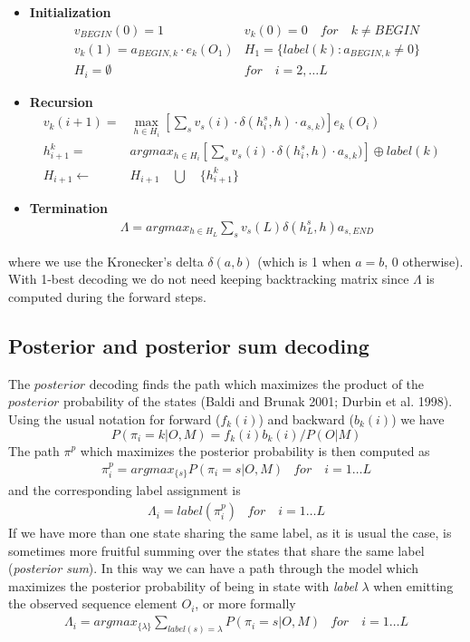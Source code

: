 \documentclass[11pt,english]{article}
\begin{document}
\begin{itemize}
\item {\bf Initialization}
\begin{eqnarray*}
v_{BEGIN}(0)=1 & v_{k}(0)=0 \quad for \quad k \neq BEGIN \\
v_k(1)=a_{BEGIN,k}\cdot e_k(O_1) & H_1=\{label(k) : a_{BEGIN,k}\neq 0 \} \\
H_{i}=\emptyset  & for \quad i=2, \dots L
\end{eqnarray*}

\item {\bf Recursion}
\begin{eqnarray*}
v_{k}(i+1) = & \max_{h\in H_i}[\sum_s v_{s}(i)\cdot \delta(h^s_i,h)\cdot a_{s,k})] e_{k}(O_{i}) \\
h^k_{i+1}= & argmax_{h\in H_i} [\sum_s v_{s}(i)\cdot \delta(h^s_i,h)\cdot a_{s,k})]\oplus label(k) \\
H_{i+1} \leftarrow & H_{i+1} \quad \bigcup \quad \{h^k_{i+1}\} &
\end{eqnarray*}

\item {\bf Termination}
\begin{eqnarray*}
\Lambda=argmax_{h\in H_L} \sum_s v_s(L)\delta(h_L^s,h)a_{s,END}
\end{eqnarray*}
\end{itemize}
where we use the Kronecker's delta $\delta(a,b)$ (which is 1 when $a=b$, 0 otherwise).
With 1-best decoding we do not need keeping backtracking 
matrix since $\Lambda$ is computed during the forward steps. 


\subsection*{Posterior and posterior sum decoding}


The $posterior$ decoding finds the path which maximizes the 
product of the $posterior$ probability of the states (Baldi 
and Brunak 2001; Durbin et al. 1998). Using the usual notation 
for forward ($f_{k}(i)$) and backward ($b_{k}(i)$) 
we have
\begin{equation}
P(\pi_i=k|O,M)=f_k(i)b_k(i)/P(O|M)
\label{eq:pos}
\end{equation}
The path $\pi^p$ which maximizes the posterior probability 
is then computed as
\begin{eqnarray}
\pi^p_i=argmax_{\{s\}} P(\pi_i=s|O,M) & for \quad i=1 \dots L
\end{eqnarray}
and the corresponding label assignment is
\begin{eqnarray}
\Lambda_i=label(\pi^p_i) & for \quad i=1 \dots L
\end{eqnarray}
If we have more than one state sharing the same label, as it 
is usual the case, is sometimes more fruitful summing over
the states that share the same label ({\em posterior sum}). 
In this way we can have a path through the model which maximizes 
the posterior probability of being in state with {\em label $\lambda$} 
when emitting the observed sequence element $O_i$, or more 
formally
\begin{eqnarray}
\Lambda_i=argmax_{\{\lambda\}}\sum_{label(s)=\lambda} P(\pi_i=s|O,M) & for \quad i=1\dots L
\end{eqnarray}
\end{document}

